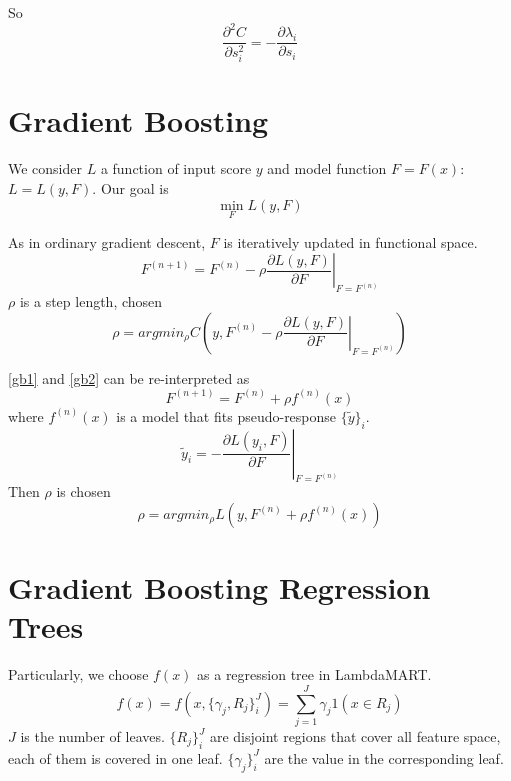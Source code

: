 \documentclass [11pt,a4paper]{article}
\begin{document}
So
\begin{equation}
\label{dd}
\frac{\partial^2 C}{\partial s_i^2}
= - \frac{\partial \lambda_i}{\partial s_i}
\end{equation}


\section{Gradient Boosting}
We consider $L$ a function of input score $y$ and model function $F=F(x)$: $L = L(y, F)$.
Our goal is
\begin{equation}
\min_{F} L(y, F)
\end{equation}


As in ordinary gradient descent, $F$ is iteratively updated in functional space.
\begin{equation}
\label{gb1}
F^{(n+1)} = F^{(n)} - \rho \left.\frac{\partial L(y, F)}{\partial F}\right|_{F=F^{(n)}}
\end{equation}
$\rho$ is a step length, chosen
\begin{equation}
\label{gb2}
\rho = argmin_{\rho} C\left(y, F^{(n)} - \rho \left.\frac{\partial L(y, F)}{\partial F}\right|_{F=F^{(n)}}\right)
\end{equation}


\ref{gb1} and \ref{gb2} can be re-interpreted as
\begin{equation}
F^{(n+1)} = F^{(n)} + \rho f^{(n)}(x)
\end{equation}
where $f^{(n)}(x)$ is a model that fits pseudo-response $\{\widetilde{y}\}_i$.
\begin{equation}
\widetilde{y}_i = - \left.\frac{\partial L(y_i, F)}{\partial F}\right|_{F=F^{(n)}}
\end{equation}
Then $\rho$ is chosen
\begin{equation}
\rho = argmin_{\rho} L(y, F^{(n)} + \rho f^{(n)}(x))
\end{equation}


\section{Gradient Boosting Regression Trees}
Particularly, we choose $f(x)$ as a regression tree in LambdaMART.
\begin{equation}
f(x) = f(x, \{\gamma_j, R_j\}_i^J) = \sum_{j=1}^{J}\gamma_j 1(x \in R_j)
\end{equation}
$J$ is the number of leaves.
$\{R_j\}_i^J$ are disjoint regions that cover all feature space, each of them is covered in one leaf.
$\{\gamma_j\}_i^J$ are the value in the corresponding leaf.
\end{document}
